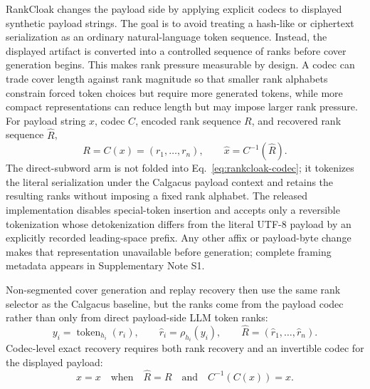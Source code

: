 \documentclass[fleqn,10pt]{wlscirep}
\begin{document}
RankCloak changes the payload side by applying explicit codecs to displayed synthetic payload strings. The goal is to avoid treating a hash-like or ciphertext serialization as an ordinary natural-language token sequence. Instead, the displayed artifact is converted into a controlled sequence of ranks before cover generation begins. This makes rank pressure measurable by design. A codec can trade cover length against rank magnitude so that smaller rank alphabets constrain forced token choices but require more generated tokens, while more compact representations can reduce length but may impose larger rank pressure.
For payload string \(x\), codec \(C\), encoded rank sequence \(R\), and recovered rank sequence \(\hat R\),
\begin{equation}
R=C(x)=(r_1,\ldots,r_n),
\qquad
\hat x=C^{-1}(\hat R).
\label{eq:rankcloak-codec}
\end{equation}
The direct-subword arm is not folded into Eq.~\eqref{eq:rankcloak-codec}; it tokenizes the literal serialization under the Calgacus payload context and retains the resulting ranks without imposing a fixed rank alphabet. The released implementation disables special-token insertion and accepts only a reversible tokenization whose detokenization differs from the literal UTF-8 payload by an explicitly recorded leading-space prefix. Any other affix or payload-byte change makes that representation unavailable before generation; complete framing metadata appears in Supplementary Note S1.

Non-segmented cover generation and replay recovery then use the same rank selector as the Calgacus baseline, but the ranks come from the payload codec rather than only from direct payload-side LLM token ranks:
\begin{equation}
y_i=\operatorname{token}_{h_i}(r_i),
\qquad
\hat r_i=\rho_{h_i}(y_i),
\qquad
\hat R=(\hat r_1,\ldots,\hat r_n).
\label{eq:rankcloak-nonseg}
\end{equation}
Codec-level exact recovery requires both rank recovery and an invertible codec for the displayed payload:
\begin{equation}
\hat x=x
\quad\text{when}\quad
\hat R=R
\quad\text{and}\quad
C^{-1}(C(x))=x.
\label{eq:codec-exact-recovery}
\end{equation}
\end{document}
